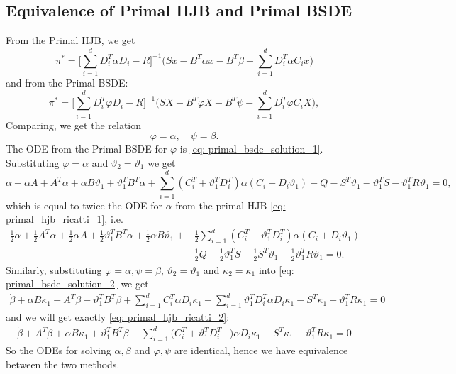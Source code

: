 \subsection{Equivalence of Primal HJB and Primal BSDE}
From the Primal HJB, we get
\begin{equation}
    \pi^\ast = \bigg[\sum_{i=1}^d D_i^T \alpha D_i - R\bigg]^{-1} \bigg(S x - B^T \alpha x - B^T \beta - \sum_{i=1}^d D_i^T \alpha C_i x\bigg)
\end{equation}
and from the Primal BSDE:
\begin{equation}
    \pi^\ast = \bigg[ \sum_{i=1}^d D_i^T \varphi D_i -  R \bigg]^{-1} \bigg( S X - B^T \varphi X - B^T \psi - \sum_{i=1}^d D_i^T \varphi C_i X \bigg),
\end{equation}
Comparing, we get the relation
\begin{equation*}
    \varphi = \alpha, \quad \psi = \beta. 
\end{equation*}
The ODE from the Primal BSDE for $\varphi$ is \eqref{eq: primal_bsde_solution_1}. Substituting $\varphi = \alpha$ and $\vartheta_2 = \vartheta_1$ we get 
\begin{equation*}
    \dot{\alpha} + \alpha A + A^T \alpha + \alpha B \vartheta_1 + \vartheta_1^T B^T \alpha + \sum_{i=1}^d (C_i^T + \vartheta_1^T D_i^T) \alpha (C_i + D_i \vartheta_1) - Q - S^T \vartheta_1 - \vartheta_1^T S - \vartheta_1^T R \vartheta_1  = 0,
\end{equation*}
which is equal to twice the ODE for $\alpha$ from the primal HJB \eqref{eq: primal_hjb_ricatti_1}, i.e. 
\begin{align*}
    \frac12 \dot{\alpha} + \frac12 A^T \alpha + \frac12 \alpha A + \frac12 \vartheta_1^T B^T \alpha + \frac12 \alpha B \vartheta_1 + &\frac12 \sum_{i=1}^d (C_i^T + \vartheta_1^T D_i^T)\alpha(C_i + D_i \vartheta_1)\\
     -& \frac12 Q - \frac12 \vartheta_1^T S - \frac12 S^T \vartheta_1 - \frac12 \vartheta_1^T R \vartheta_1 = 0.
\end{align*}
Similarly, substituting $\varphi=\alpha, \psi = \beta$, $\vartheta_2 = \vartheta_1$ and $\kappa_2 = \kappa_1$ into \eqref{eq: primal_bsde_solution_2} we get
\begin{align*}
    \dot{\beta} + \alpha B \kappa_1 + A^T \beta + \vartheta_1^T B^T \beta + \sum_{i=1}^d C_i^T \alpha D_i \kappa_1 + \sum_{i=1}^d \vartheta_1^T D_i^T \alpha D_i \kappa_1 - S^T \kappa_1 - \vartheta_1^T R \kappa_1 = 0
\end{align*}
and we will get exactly \eqref{eq: primal_hjb_ricatti_2}:
\begin{align*}
    \dot{\beta} + A^T \beta + \alpha B \kappa_1 + \vartheta_1^T B^T \beta + \sum_{i=1}^d (C_i^T + \vartheta_1^T D_i^T&)\alpha D_i \kappa_1 -  S^T \kappa_1 - \vartheta_1^T R \kappa_1 = 0 
\end{align*}
So the ODEs for solving $\alpha, \beta$ and $\varphi, \psi$ are identical, hence we have equivalence between the two methods.


